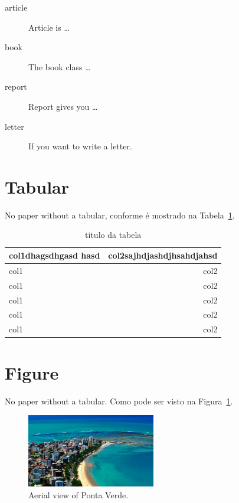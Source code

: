 \documentclass[12pt, a4paper, twoside, titlepage]{article}
\begin{document}

 \begin{description}
 	\item[article\label{article}] {Article is \ldots}
 	\item[book\label{book}]       {The book class \ldots}
 	\item[report\label{report}]   {Report gives you \ldots}
 	\item[letter\label{letter}]   {If you want to write a letter.}
 \end{description}

\section{Tabular}
No paper without a tabular, conforme é mostrado na Tabela~\ref{tab:novatabela}.

\begin{table}
	\caption{titulo da tabela}
	\label{tab:novatabela}
	\centering
	\begin{tabular}{p{5cm}|r}
		\hline
		\hline
		col1dhagsdhgasd hasd  & col2sajhdjashdjhsahdjahsd\\
		\hline
		col1  & col2\\
		\hline
		col1  & col2\\
		\hline
		col1  & col2\\
		\hline
		col1  & col2\\
		\hline
		col1  & col2\\
		\hline
		\hline
	\end{tabular} 
\end{table}


\section{Figure}
No paper without a tabular. Como pode ser visto na Figura~\ref{fig:maceio}.

\begin{figure}[h]
	\centering
 	\includegraphics[width=0.5\textwidth]{maceio}
 	\caption{Aerial view of Ponta Verde.}
 	\label{fig:maceio}
\end{figure} 
\end{document}

